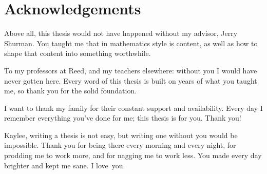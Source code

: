 \chapter*{Acknowledgements}

Above all, this thesis would not have happened without my advisor, Jerry Shurman.
You taught me that in mathematics style is content, as well as how to shape that content into something worthwhile.

To my professors at Reed, and my teachers elsewhere: without you I would have never gotten here.
Every word of this thesis is built on years of what you taught me, so thank you for the solid foundation.

I want to thank my family for their constant support and availability.
Every day I remember everything you've done for me; this thesis is for you.
Thank you!

Kaylee, writing a thesis is not easy, but writing one without you would be impossible.
Thank you for being there every morning and every night, for prodding me to work more, and for nagging me to work less. 
You made every day brighter and kept me sane.
I love~you.
